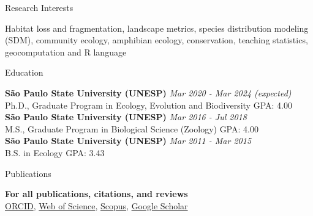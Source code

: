 \documentclass{resume}
\begin{document}

\begin{rSection}{Research Interests}

Habitat loss and fragmentation, landscape metrics, species distribution modeling (SDM), community ecology, amphibian ecology, conservation, teaching statistics, geocomputation and R language

\end{rSection}


\begin{rSection}{Education}

{\bf São Paulo State University (UNESP)} \hfill {\em Mar 2020 - Mar 2024 (expected)} \\ 
Ph.D., Graduate Program in Ecology, Evolution and Biodiversity \hfill { GPA: 4.00 } \\ 

{\bf São Paulo State University (UNESP)} \hfill {\em Mar 2016 - Jul 2018} \\ 
M.S., Graduate Program in Biological Science (Zoology)\hfill { GPA: 4.00 } \\ 

{\bf São Paulo State University (UNESP)} \hfill {\em Mar 2011 - Mar 2015} \\ 
B.S. in Ecology\hfill { GPA: 3.43 } \\ 

\end{rSection}


\begin{rSection}{Publications}

{\bf For all publications, citations, and reviews}
\\ \href{https://orcid.org/0000-0001-9650-7575}{ORCID}, \href{https://www.webofscience.com/wos/author/record/837504}{Web of Science}, \href{https://www.scopus.com/authid/detail.uri?authorId=57193451888}{Scopus}, \href{https://scholar.google.com/citations?user=i-2xZBQAAAAJ}{Google Scholar}

\end{rSection}
\end{document}
